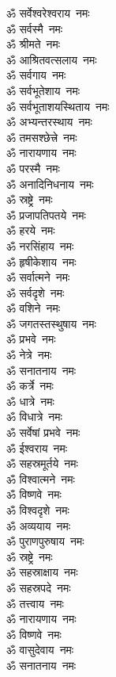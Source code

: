 \begin{multicols}{2}
\begin{flushleft}
ॐ सर्वेश्वरेश्वराय~नमः\\
ॐ सर्वस्मै~नमः\\
ॐ श्रीमते~नमः\hfill{}\\
ॐ आश्रितवत्सलाय~नमः\\
ॐ सर्वगाय~नमः\\
ॐ सर्वभूतेशाय~नमः\\
ॐ सर्वभूताशयस्थिताय~नमः\\
ॐ अभ्यन्तरस्थाय~नमः\\
ॐ तमसश्छेत्त्रे~नमः\\
ॐ नारायणाय~नमः\\
ॐ परस्मै~नमः\\
ॐ अनादिनिधनाय~नमः\\
ॐ स्रष्ट्रे~नमः\hfill{}\\
ॐ प्रजापतिपतये~नमः\\
ॐ हरये~नमः\\
ॐ नरसिंहाय~नमः\\
ॐ हृषीकेशाय~नमः\\
ॐ सर्वात्मने~नमः\\
ॐ सर्वदृशे~नमः\\
ॐ वशिने~नमः\\
ॐ जगतस्तस्थुषाय~नमः\\
ॐ प्रभवे~नमः\\
ॐ नेत्रे~नमः\hfill{}\\
ॐ सनातनाय~नमः\\
ॐ कर्त्रे~नमः\\
ॐ धात्रे~नमः\\
ॐ विधात्रे~नमः\\
ॐ सर्वेषां प्रभवे~नमः\\
ॐ ईश्वराय~नमः\\
ॐ सहस्रमूर्तये~नमः\\
ॐ विश्वात्मने~नमः\\
ॐ विष्णवे~नमः\\
ॐ विश्वदृशे~नमः\hfill{}\\
ॐ अव्ययाय~नमः\\
ॐ पुराणपुरुषाय~नमः\\
ॐ स्रष्ट्रे~नमः\\
ॐ सहस्राक्षाय~नमः\\
ॐ सहस्रपदे~नमः\\
ॐ तत्त्वाय~नमः\\
ॐ नारायणाय~नमः\\
ॐ विष्णवे~नमः\\
ॐ वासुदेवाय~नमः\\
ॐ सनातनाय~नमः\hfill{}\\

\end{flushleft}
\end{multicols}
